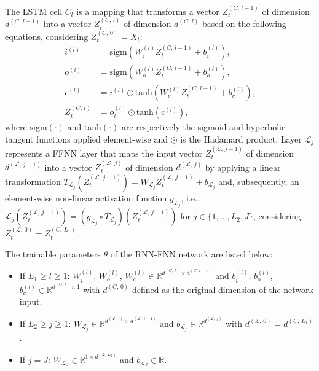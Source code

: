 \documentclass[12pt]{article}
\begin{document}
 The LSTM cell $C_{l}$ is a mapping that transforms a vector $Z^{(C,\,l-1)}_{t}$ of dimension $d^{(C,\, l-1)}$ into a vector $Z^{(C,\, l)}_{t}$ of dimension $d^{(C,\, l)}$ based on the following equations, considering $Z^{(C,\, 0)}_{t}=X_{t}$:
\begin{align*}
    i^{(l)} &= \mbox{sigm}(W_{i}^{(l)}Z_{t}^{(C,\, l-1)}+b_{i}^{(l)})\mbox{,}\\
    o^{(l)} &= \mbox{sigm}(W_{o}^{(l)}Z_{t}^{(C,\, l-1)}+b_{o}^{(l)})\mbox{,}\\
    c^{(l)} &= i^{(l)}\odot \mbox{tanh}(W_{c}^{(l)}Z_{t}^{(C,\, l-1)}+b_{c}^{(l)})\mbox{,}\\
    Z_{t}^{(C,\, l)} &= o_{t}^{(l)}\odot \mbox{tanh}(c^{(l)})\mbox{,}
\end{align*}
where $\mbox{sigm}(\cdot)$ and $\mbox{tanh}(\cdot)$ are respectively the sigmoid and hyperbolic tangent functions applied element-wise and $\odot$ is the Hadamard product. Layer $\mathcal{L}_{j}$ represents a FFNN layer that maps the input vector $Z^{(\mathcal{L},\, j-1)}_{t}$ of dimension $d^{(\mathcal{L},\, j-1)}$ into a vector $Z^{(\mathcal{L},\, j)}_{t}$ of dimension $d^{(\mathcal{L},\, j)}$ by applying a linear transformation $T_{\mathcal{L}_{j}}(Z^{(\mathcal{L},\, j-1)}_{t})=W_{\mathcal{L}_{j}}Z^{(\mathcal{L},\, j-1)}_{t} + b_{\mathcal{L}_{j}}$ and, subsequently, an element-wise non-linear activation function $g_{\mathcal{L}_{j}}$, i.e., $\mathcal{L}_{j}(Z^{(\mathcal{L},\, j-1)}_{t})=(g_{\mathcal{L}_{j}} \circ T_{\mathcal{L}_{j}})(Z^{(\mathcal{L},\, j-1)}_{t})$ for $j\in\{1,...,L_{2},J\}$, considering $Z^{(\mathcal{L},\, 0)}_{t}=Z^{(C,\, L_{1})}_{t}$.

The trainable parameters $\theta$ of the RNN-FNN network are listed below:
\begin{itemize}
    \item  If $L_{1}\geq l\geq 1$: $W_{i}^{(l)}$, $W_{o}^{(l)}$, $W_{c}^{(l)}\in \mathbb{R}^{d^{(C,\, l)}\times d^{(C,\, l-1)}}$ and $b_{i}^{(l)}$, $b_{o}^{(l)}$, $b_{c}^{(l)}\in \mathbb{R}^{d^{(C,\, l)}\times 1}$ with $d^{(C,\, 0)}$ defined as the original dimension of the network input.
    \item If $L_{2}\geq j\geq 1$: $W_{\mathcal{L}_{j}}\in \mathbb{R}^{d^{(\mathcal{L},\, j)}\times d^{(\mathcal{L},\, j-1)}}$ and $b_{\mathcal{L}_{j}}\in \mathbb{R}^{d^{(\mathcal{L},\, j)}}$ with $d^{(\mathcal{L},\, 0)}=d^{(C,\, L_{1})}$.
    \item If $j=J$: $W_{\mathcal{L}_{J}}\in \mathbb{R}^{1\times d^{(\mathcal{L},\, L_{2})}}$ and $b_{\mathcal{L}_{J}}\in \mathbb{R}$.
\end{itemize}
\end{document}
